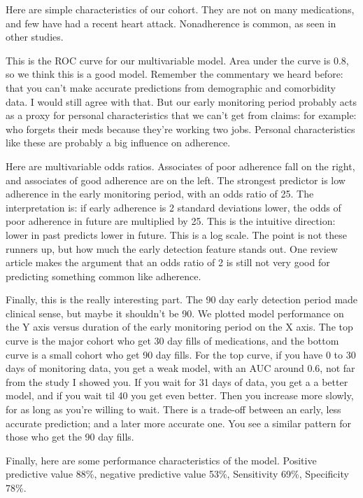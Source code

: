 \documentclass[12pt]{report}
\begin{document}
\begin{large}
Here are simple characteristics of our cohort. They are not on many
medications, and few have had a recent heart attack. Nonadherence is
common, as seen in other studies.

This is the ROC curve for our multivariable model. Area under the
curve is 0.8, so we think this is a good model. Remember the
commentary we heard before: that you can't make accurate predictions
from demographic and comorbidity data. I would still agree with that.
But our early monitoring period probably acts as a proxy for personal
characteristics that we can't get from claims: for example: who
forgets their meds because they're working two jobs. Personal
characteristics like these are probably a big influence on adherence.

Here are multivariable odds ratios. Associates of poor adherence fall
on the right, and associates of good adherence are on the left. The
strongest predictor is low adherence in the early monitoring period,
with an odds ratio of 25. The interpretation is: if early adherence is
2 standard deviations lower, the odds of poor adherence in future are
multiplied by 25. This is the intuitive direction: lower in past
predicts lower in future. This is a log scale. The point is not these
runners up, but how much the early detection feature stands out. One
review article makes the argument that an odds ratio of 2 is still not
very good for predicting something common like adherence.

Finally, this is the really interesting part. The 90 day early
detection period made clinical sense, but maybe it shouldn't be 90. We
plotted model performance on the Y axis versus duration of the early
monitoring period on the X axis. The top curve is the major cohort who
get 30 day fills of medications, and the bottom curve is a small
cohort who get 90 day fills. For the top curve, if you have 0 to 30
days of monitoring data, you get a weak model, with an AUC around 0.6,
not far from the study I showed you. If you wait for 31 days of data,
you get a a better model, and if you wait til 40 you get even better.
Then you increase more slowly, for as long as you're willing to wait.
There is a trade-off between an early, less accurate prediction; and a
later more accurate one. You see a similar pattern for those who get
the 90 day fills.

Finally, here are some performance characteristics of the model.
Positive predictive value 88\%, negative predictive value 53\%,
Sensitivity 69\%, Specificity 78\%.


\end{large}
\end{document}
